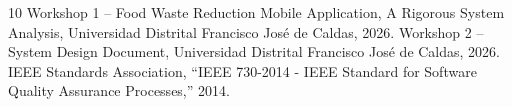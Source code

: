 \documentclass[9pt,conference]{IEEEtran}
\begin{document}
\begin{thebibliography}{10}
 Workshop 1 – Food Waste Reduction Mobile Application, A Rigorous System Analysis, Universidad Distrital Francisco José de Caldas, 2026.
 Workshop 2 – System Design Document, Universidad Distrital Francisco José de Caldas, 2026.
 IEEE Standards Association, ``IEEE 730-2014 - IEEE Standard for Software Quality Assurance Processes,'' 2014.
\end{thebibliography}
\end{document}
